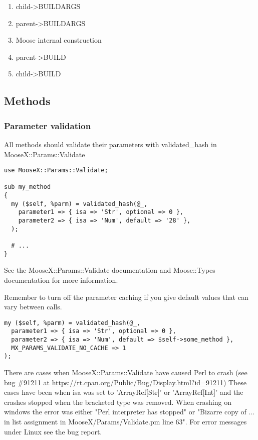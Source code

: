 \begin{enumerate}
	\item child->BUILDARGS
	\item parent->BUILDARGS
	\item Moose internal construction
	\item parent->BUILD
	\item child->BUILD
\end{enumerate}


\subsection{Methods}

\subsubsection{Parameter validation}
All methods should validate their parameters with validated\_hash in \mbox{MooseX::Params::Validate}

\begin{verbatim}
use MooseX::Params::Validate;

sub my_method
{
  my ($self, %parm) = validated_hash(@_,
    parameter1 => { isa => 'Str', optional => 0 },
    parameter2 => { isa => 'Num', default => '28' },
  );

  # ...
}
\end{verbatim}

See the MooseX::Params::Validate documentation \cite{params} and Moose::Types documentation \cite{types} for more information.

Remember to turn off the parameter caching if you give default values that can vary between calls.

\begin{verbatim}
my ($self, %parm) = validated_hash(@_,
  parameter1 => { isa => 'Str', optional => 0 },
  parameter2 => { isa => 'Num', default => $self->some_method },
  MX_PARAMS_VALIDATE_NO_CACHE => 1
);
\end{verbatim}

There are cases when MooseX::Params::Validate have caused Perl to crash (see bug \#91211 at \url{https://rt.cpan.org/Public/Bug/Display.html?id=91211})
These cases have been when isa was set to 'ArrayRef[Str]' or 'ArrayRef[Int]' and the crashes stopped when the bracketed type was removed. When crashing on windows the error was either "Perl interpreter has stopped" or "Bizarre copy of ... in list assignment in MooseX/Params/Validate.pm line 63". For error messages under Linux see the bug report.


